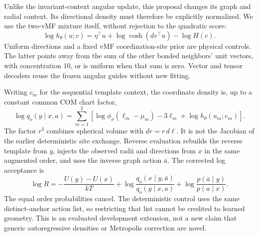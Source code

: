 Unlike the invariant-context angular update, this proposal changes its graph and
radial context. Its directional density must therefore be explicitly normalized.
We use the two-vMF mixture itself, without rejection to the quadratic score:
\begin{equation}
 \log h_\theta(u;c)=\eta^\top u+\log\cosh(dv^\top u)-\log H(c).
\end{equation}
Uniform directions and a fixed vMF coordination-site prior are physical controls.
The latter points away from the sum of the other bonded neighbors' unit vectors,
with concentration 10, or is uniform when that sum is zero. Vector and tensor
decoders reuse the frozen angular guides without new fitting.

Writing $c_m$ for the sequential template context, the coordinate density is,
up to a constant common COM chart factor,
\begin{equation}
 \log q_o(y\mid x,a)=\sum_{m=1}^2
 \left[\log\phi_\sigma(\ell_m-\mu_m)-3\ell_m
       +\log h_\theta(u_m;c_m)\right].
 \label{eq:joint-q}
\end{equation}
The factor $r^3$ combines spherical volume with $dr=r\,d\ell$. It is not the
Jacobian of the earlier deterministic site exchange. Reverse evaluation rebuilds
the reverse template from $y$, injects the observed radii and directions from $x$
in the same augmented order, and uses the inverse graph action $\bar a$.
The corrected log acceptance is
\begin{equation}
 \log R=-\frac{U(y)-U(x)}{kT}
 +\log\frac{q_o(x\mid y,\bar a)}{q_o(y\mid x,a)}
 +\log\frac{p(\bar a\mid y)}{p(a\mid x)}.
 \label{eq:joint-mh}
\end{equation}
The equal order probabilities cancel. The deterministic control uses the same
distinct-anchor action list, so restricting that list cannot be credited to
learned geometry. This is an evaluated development extension, not a new claim
that generic autoregressive densities or Metropolis correction are novel.

